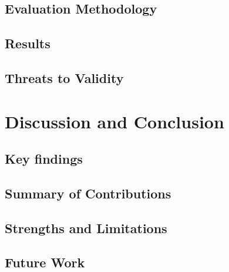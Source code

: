     \section{Evaluation Methodology}
    \section{Results}
    \section{Threats to Validity}

\chapter{Discussion and Conclusion}
    \section{Key findings}
    \section{Summary of Contributions}
    \section{Strengths and Limitations}
    \section{Future Work}
